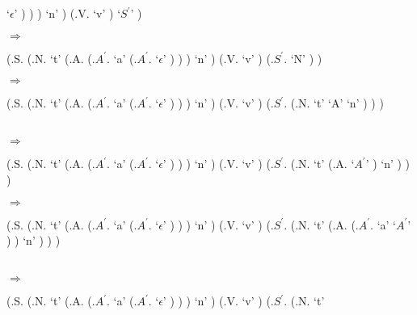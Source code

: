 \documentclass[fleqn]{article}
\begin{document}
\begin{enumerate}
\begin{parsetree}
              `$\epsilon$'
            )
          )
        )
        `n'
      )
      (.V.
        `v'
      )
      `$S^{\prime}$'
    )
  \end{parsetree}
  $\Longrightarrow$
  \begin{parsetree}
    (.S.
      (.N.
        `t'
        (.A.
          (.$A^{\prime}$.
            `a'
            (.$A^{\prime}$.
              `$\epsilon$'
            )
          )
        )
        `n'
      )
      (.V.
        `v'
      )
      (.$S^{\prime}$.
        `N'
      )
    )
  \end{parsetree}
  $\Longrightarrow$
  \begin{parsetree}
    (.S.
      (.N.
        `t'
        (.A.
          (.$A^{\prime}$.
            `a'
            (.$A^{\prime}$.
              `$\epsilon$'
            )
          )
        )
        `n'
      )
      (.V.
        `v'
      )
      (.$S^{\prime}$.
        (.N.
          `t'
          `A'
          `n'
        )
      )
    )
  \end{parsetree}\\
  $\Longrightarrow$
  \begin{parsetree}
    (.S.
      (.N.
        `t'
        (.A.
          (.$A^{\prime}$.
            `a'
            (.$A^{\prime}$.
              `$\epsilon$'
            )
          )
        )
        `n'
      )
      (.V.
        `v'
      )
      (.$S^{\prime}$.
        (.N.
          `t'
          (.A.
            `$A^{\prime}$'
          )
          `n'
        )
      )
    )
  \end{parsetree}
  $\Longrightarrow$
  \begin{parsetree}
    (.S.
      (.N.
        `t'
        (.A.
          (.$A^{\prime}$.
            `a'
            (.$A^{\prime}$.
              `$\epsilon$'
            )
          )
        )
        `n'
      )
      (.V.
        `v'
      )
      (.$S^{\prime}$.
        (.N.
          `t'
          (.A.
            (.$A^{\prime}$.
              `a'
              `$A^{\prime}$'
            )
          )
          `n'
        )
      )
    )
  \end{parsetree}\\
  $\Longrightarrow$
  \begin{parsetree}
    (.S.
      (.N.
        `t'
        (.A.
          (.$A^{\prime}$.
            `a'
            (.$A^{\prime}$.
              `$\epsilon$'
            )
          )
        )
        `n'
      )
      (.V.
        `v'
      )
      (.$S^{\prime}$.
        (.N.
          `t'

\end{parsetree}
\end{enumerate}
\end{document}
